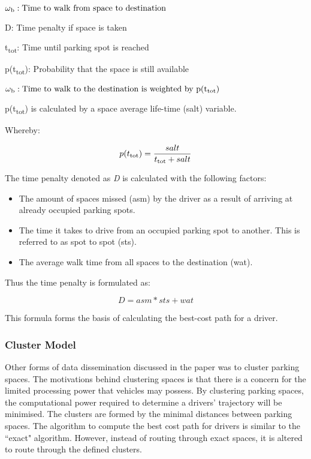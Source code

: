 \begin{math}
\omega\textsubscript{b}: \textrm{Time to walk from space to destination}
\end{math}

D: Time penalty if space is taken

t\textsubscript{tot}: Time until parking spot is reached

p(t\textsubscript{tot}): Probability that the space is still available

\begin{math}
    \omega\textsubscript{b}:  \textrm{Time to walk to the destination is weighted by p(t\textsubscript{tot})}
\end{math}

p(t\textsubscript{tot}) is calculated by a space average life-time (salt) variable. 

Whereby: 

\[ p(t\textsubscript{tot}) = \frac{salt}{t\textsubscript{tot} + salt} \]

The time penalty denoted as \textit{D} is calculated with the following factors:
\begin{itemize}
    \item The amount of spaces missed (asm) by the driver as a result of arriving at already occupied parking spots.
    \item The time it takes to drive from an occupied parking spot to another. This is referred to as spot to spot  (sts).
    \item The average walk time from all spaces to the destination (wat).
\end{itemize}

Thus the time penalty is formulated as:

\[ D = asm * sts + wat \]

This formula forms the basis of calculating the best-cost path for a driver.

\subsubsection{Cluster Model}\label{sssec:cluster}
Other forms of data dissemination discussed in the paper \citep{Verroios2011ReachingNetworking} was to cluster parking spaces. The motivations behind clustering spaces is that there is a concern for the limited processing power that vehicles may possess. By clustering parking spaces, the computational power required to determine a drivers' trajectory will be minimised. The clusters are formed by the minimal distances between parking spaces. The algorithm to compute the best cost path for drivers is similar to the ``exact" algorithm. However, instead of routing through exact spaces, it is altered to route through the defined clusters.

